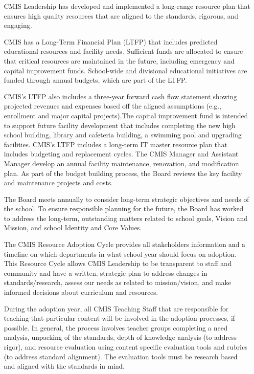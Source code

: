 \begin{findings}
CMIS Leadership has developed and implemented a long-range resource plan that ensures high quality resources that are aligned to the standards, rigorous, and engaging. 


CMIS has a Long-Term Financial Plan (LTFP) that includes predicted educational resources and facility needs. Sufficient funds are allocated to ensure that critical resources are maintained in the future, including emergency and capital improvement funds. School-wide and divisional educational initiatives are funded through annual budgets, which are part of the LTFP.

CMIS’s LTFP also includes a three-year forward cash flow statement showing projected revenues and expenses based off the aligned assumptions (e.g., enrollment and major capital projects).The capital improvement fund is intended to support future facility development that includes completing the new high school building, library and cafeteria building, a swimming pool and upgrading facilities. CMIS’s LTFP includes a long-term IT master resource plan that includes budgeting and replacement cycles. The CMIS Manager and Assistant Manager develop an annual facility maintenance, renovation, and modification plan. As part of the budget building process, the Board reviews the key facility and maintenance projects and costs.

The Board meets annually to consider long-term strategic objectives and needs of the school. To ensure responsible planning for the future, the Board has worked to address the long-term, outstanding matters related to school goals, Vision and Mission, and school Identity and Core Values.


The CMIS Resource Adoption Cycle provides all stakeholders information and a timeline on which departments in what school year should focus on adoption. This Resource Cycle allows CMIS Leadership to be transparent to staff and community and have a written, strategic plan to address changes in standards/research, assess our needs as related to mission/vision, and make informed decisions about curriculum and resources. 

During the adoption year, all CMIS Teaching Staff that are responsible for teaching that particular content will be involved in the adoption processes, if possible. In general, the process involves teacher groups completing a need analysis, unpacking of the standards, depth of knowledge analysis (to address rigor), and resource evaluation using content specific evaluation tools and rubrics (to address standard alignment). The evaluation tools must be research based and aligned with the standards in mind. 


\end{findings}
